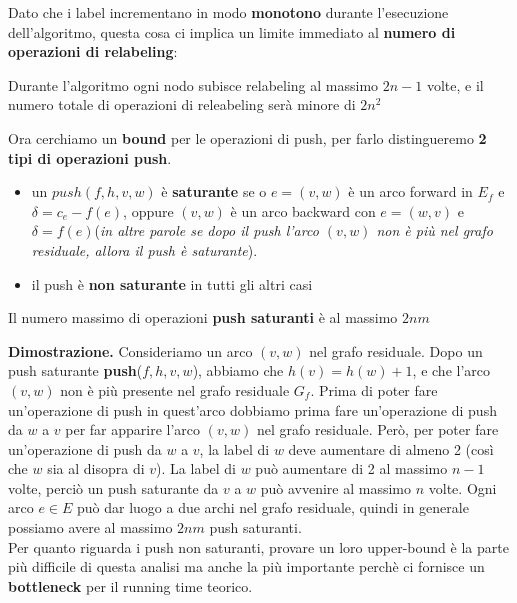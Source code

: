 Dato che i label incrementano in modo \textbf{monotono} durante l'esecuzione dell'algoritmo, questa cosa ci implica un limite immediato al \textbf{numero di operazioni di relabeling}:

\begin{myblockquote}
	Durante l'algoritmo ogni nodo subisce relabeling al massimo $2n-1$ volte, e il numero totale di operazioni di releabeling serà minore di $2n^2$
\end{myblockquote}

Ora cerchiamo un \textbf{bound} per le operazioni di push, per farlo distingueremo \textbf{2 tipi di operazioni push}.
\begin{itemize}
	\item un $push(f, h, v, w)$ è \textbf{saturante} se o $e = (v, w)$ è un arco forward in $E_f$ e $\delta = c_e - f(e)$, oppure $(v,w)$ è un arco backward con $e = (w,v)$ e $\delta = f(e)$(\textit{in altre parole se dopo il push l'arco $(v,w)$ non è più nel grafo residuale, allora il push è saturante}).
	\item il push è \textbf{non saturante} in tutti gli altri casi
\end{itemize}

\begin{myblockquote}
	Il numero massimo di operazioni \textbf{push saturanti} è al massimo $2nm$
\end{myblockquote}

\textbf{Dimostrazione.}
Consideriamo un arco $(v, w)$ nel grafo residuale. Dopo un push saturante
\textbf{push}($f, h, v, w$), abbiamo che $h(v) = h(w) + 1$, e che l'arco $(v, w)$ non è più presente nel grafo residuale $G_f$. Prima di poter fare un'operazione di push in quest'arco
dobbiamo prima fare un'operazione di push da $w$ a $v$ per far apparire l'arco
$(v, w)$ nel grafo residuale. Però, per poter fare un'operazione di push da $w$ a $v$,
la label di $w$ deve aumentare di almeno 2 (così che $w$ sia al disopra di $v$). La
label di $w$ può aumentare di 2 al massimo $n - 1$ volte, perciò un push saturante da $v$
a $w$ può avvenire al massimo $n$ volte. Ogni arco $e \in E$ può dar luogo a due archi nel grafo residuale, quindi in generale possiamo avere al massimo $2nm$ push saturanti.\\

Per quanto riguarda i push non saturanti, provare un loro upper-bound è la parte più difficile di questa analisi ma anche la più importante perchè ci fornisce un \textbf{bottleneck} per il running time teorico.

